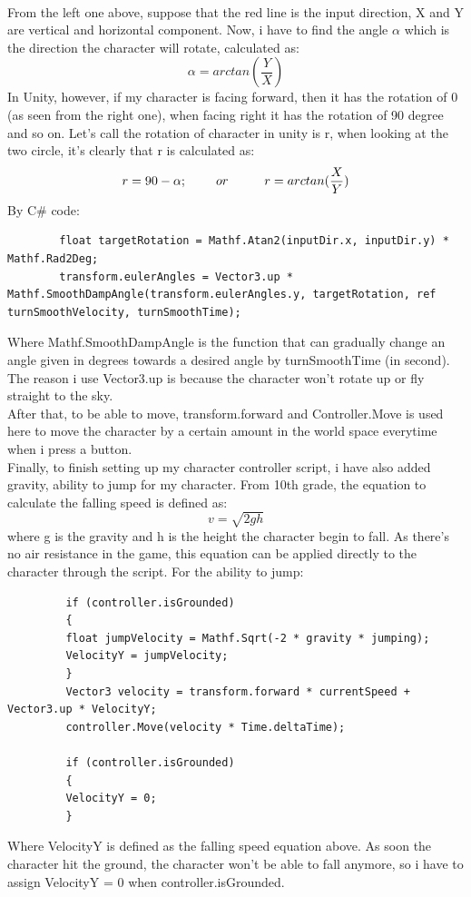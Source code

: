 \documentclass[a4paper, 13pt]{extarticle}
\begin{document}
 	 	\\[0.02cm]
 	 	From the left one above, suppose that the red line is the input direction, X and Y are vertical and horizontal component. Now, i have to find the angle {$\alpha$} which is the direction the character will rotate, calculated as: 
 	 	\\[-0.5cm]
 	 	\[\alpha = arctan(\frac{Y}{X})\]
 	 	In Unity, however, if my character is facing forward, then it has the rotation of 0 (as seen from the right one), when facing right it has the rotation of 90 degree and so on. Let's call the rotation of character in unity is r, when looking at the two circle, it's clearly that r is calculated as: \\[-0.5cm]
 	 	 \[r = 90 - \alpha; \hspace{0.8cm} or \hspace{1.0cm} r = arctan(\frac{X}{Y})\] 
 	 	By C\# code:
 	 	\begin{lstlisting}
 	 	float targetRotation = Mathf.Atan2(inputDir.x, inputDir.y) * Mathf.Rad2Deg;
 	 	transform.eulerAngles = Vector3.up * Mathf.SmoothDampAngle(transform.eulerAngles.y, targetRotation, ref turnSmoothVelocity, turnSmoothTime);
 	 	\end{lstlisting}
 	 	
 	 	Where Mathf.SmoothDampAngle is the function that can gradually change an angle given in degrees towards a desired angle by turnSmoothTime (in second). The reason i use Vector3.up is because the character won't rotate up or fly straight to the sky.  \\[0.15cm] After that, to be able to move, transform.forward and Controller.Move is used here to move the character by a certain amount in the world space everytime when i press a button. \\[0.15cm] Finally, to finish setting up my character controller script, i have also added gravity, ability to jump for my character. From 10th grade, the equation to calculate the falling speed is defined as: 
 	 	\\[-0.5cm]
 	 	 \[v = \sqrt{2gh}\]
 	 	 where g is the gravity and h is the height the character begin to fall. As there's no air resistance in the game, this equation can be applied directly to the character through the script. For the ability to jump:
 	 	 \begin{lstlisting}
 	 	 if (controller.isGrounded)
 	 	 {
 	 	 float jumpVelocity = Mathf.Sqrt(-2 * gravity * jumping);
 	 	 VelocityY = jumpVelocity;
 	 	 }
 	 	 Vector3 velocity = transform.forward * currentSpeed + Vector3.up * VelocityY;
 	 	 controller.Move(velocity * Time.deltaTime);
 	 	 
 	 	 if (controller.isGrounded)
 	 	 {
 	 	 VelocityY = 0;  
 	 	 }
 	 	 \end{lstlisting}
 	 	 Where VelocityY is defined as the falling speed equation above. As soon the character hit the ground, the character won't be able to fall anymore, so i have to assign VelocityY = 0 when controller.isGrounded. 
\end{document}
